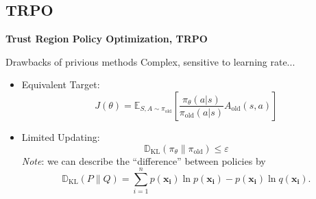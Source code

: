 \subsection{TRPO}
\begin{frame}
    \textbf{Trust Region Policy Optimization, TRPO}
    \begin{block}{Drawbacks of privious methods}
        Complex, sensitive to learning rate...
    \end{block}

    \begin{itemize}
        \item Equivalent Target: 
        $$
        J(\theta) = \mathbb{E}_{S,A \sim \pi_{\text{old}}}\left[
            \frac{\pi_\theta(a|s)}{\pi_{\text{old}}(a|s)} A_{\text{old}}(s,a)
        \right]
        $$

        \item Limited Updating: $$
        \mathbb{D}_{\text{KL}}(\pi_\theta \| \pi_{\text{old}}) \leq \varepsilon
        $$
        \textit{Note}: we can describe the ``difference'' between policies by 
        $$
        \mathbb{D}_{\text{KL}}(P\|Q) = \sum_{i=1}^n p(\mathbf{x_i})\ln p(\mathbf{x_i}) - p(\mathbf{x_i}) \ln q(\mathbf{x_i}).
        $$
    \end{itemize}
\end{frame}
